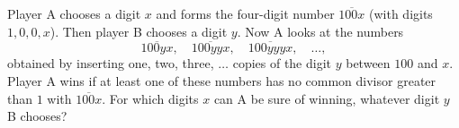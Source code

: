 Player A chooses a digit $x$ and forms the four-digit number $\overline{100x}$ (with digits $1,0,0,x$). Then player B chooses a digit $y$. Now A looks at the numbers
\[\overline{100yx},\quad\overline{100yyx},\quad\overline{100yyyx},\quad\dots,\]
obtained by inserting one, two, three, $\dots$ copies of the digit $y$ between $100$ and $x$. Player A wins if at least one of these numbers has no common divisor greater than $1$ with $\overline{100x}$. For which digits $x$ can A be sure of winning, whatever digit $y$ B chooses?
